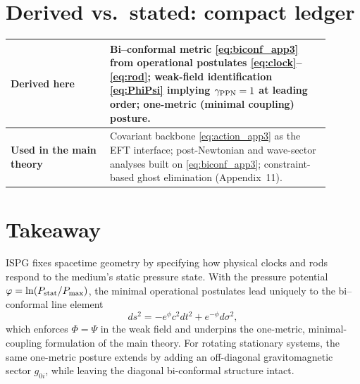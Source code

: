 \documentclass[11pt]{article}
\begin{document}
\section{Derived vs.\ stated: compact ledger}\label{sec:ledger_app3}
\begin{center}
\begin{tabular}{@{}p{0.28\linewidth}p{0.62\linewidth}@{}}
\toprule
\textbf{Derived here} &
Bi--conformal metric \eqref{eq:biconf_app3} from operational postulates \eqref{eq:clock}--\eqref{eq:rod}; weak-field identification \eqref{eq:PhiPsi} implying $\gamma_{\rm PPN}=1$ at leading order; one-metric (minimal coupling) posture.\\
\midrule
\textbf{Used in the main theory} &
Covariant backbone \eqref{eq:action_app3} as the EFT interface; post-Newtonian and wave-sector analyses built on \eqref{eq:biconf_app3}; constraint-based ghost elimination (Appendix~11).\\
\bottomrule
\end{tabular}
\end{center}

\section*{Takeaway}
ISPG fixes spacetime geometry by specifying how physical clocks and rods respond to the medium's static pressure state. With the pressure potential $\phi=\ln(P_{\rm stat}/P_{\max})$, the minimal operational postulates lead uniquely to the bi--conformal line element
\[
ds^2=-e^{\phi}c^2dt^2+e^{-\phi}d\sigma^2,
\]
which enforces $\Phi=\Psi$ in the weak field and underpins the one-metric, minimal-coupling formulation of the main theory. For rotating stationary systems, the same one-metric posture extends by adding an off-diagonal gravitomagnetic sector $g_{0i}$, while leaving the diagonal bi-conformal structure intact.
\end{document}
